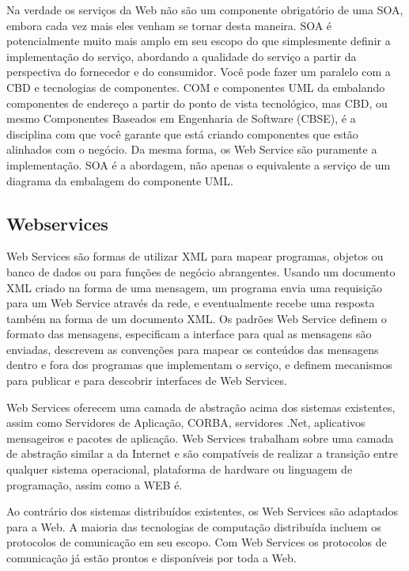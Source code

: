\documentclass{acm_proc_article-sp}
\begin{document}
		\cite{SOA-W3C}
		
		Na verdade os serviços da Web não são um componente obrigatório de uma SOA, embora cada vez mais eles venham se tornar desta maneira. SOA é potencialmente muito mais amplo em seu escopo do que simplesmente definir a implementação do serviço, abordando a qualidade do serviço a partir da perspectiva do fornecedor e do consumidor. Você pode fazer um paralelo com a CBD e tecnologias de componentes. COM e componentes UML da embalando componentes de endereço a partir do ponto de vista tecnológico, mas CBD, ou mesmo Componentes Baseados em Engenharia de Software (CBSE), é a disciplina com que você garante que está criando componentes que estão alinhados com o negócio. Da mesma forma, os Web Service são puramente a implementação. SOA é a abordagem, não apenas o equivalente a serviço de um diagrama da embalagem do componente UML.
		
		\cite{SOA-Microsoft}
		
	\subsection{Webservices}
		
		Web Services são formas de utilizar XML para mapear programas, objetos ou banco de dados ou para funções de negócio abrangentes. Usando um documento XML criado na forma de uma mensagem, um programa envia uma requisição para um Web Service através da rede, e eventualmente recebe uma resposta também na forma de um documento XML. Os padrões Web Service definem o formato das mensagens, especificam a interface para qual as mensagens são enviadas, descrevem as convenções para mapear os conteúdos das mensagens dentro e fora dos programas que implementam o serviço, e definem mecanismos para publicar e para descobrir interfaces de Web Services.
		
		Web Services oferecem uma camada de abstração acima dos sistemas existentes, assim como Servidores de Aplicação, CORBA, servidores .Net, aplicativos mensageiros e pacotes de aplicação. Web Services trabalham sobre 
		uma camada de abstração similar a da Internet e são compatíveis de realizar a transição entre qualquer sistema operacional, plataforma de hardware ou linguagem de programação, assim como a WEB é.
		
		Ao contrário dos sistemas distribuídos existentes, os Web Services são adaptados para a Web. A maioria das tecnologias de computação distribuída incluem os protocolos de comunicação em seu escopo. Com Web Services os protocolos de comunicação já estão prontos e disponíveis por toda a Web. 
		
\end{document}

